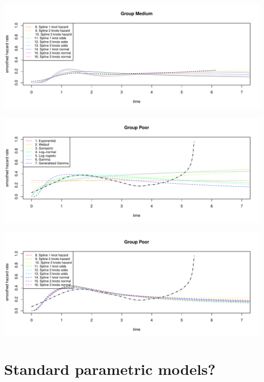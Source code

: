 \documentclass[]{article}
\begin{document}
\begin{flushleft}\includegraphics[height=0.29\textheight]{Images/plot_haz_pred-4} \end{flushleft}

\begin{flushleft}\includegraphics[height=0.29\textheight]{Images/plot_haz_pred-5} \end{flushleft}

\begin{flushleft}\includegraphics[height=0.29\textheight]{Images/plot_haz_pred-6} \end{flushleft}

\newpage

\section{Standard parametric models?}\label{standard-parametric-models}
\end{document}
